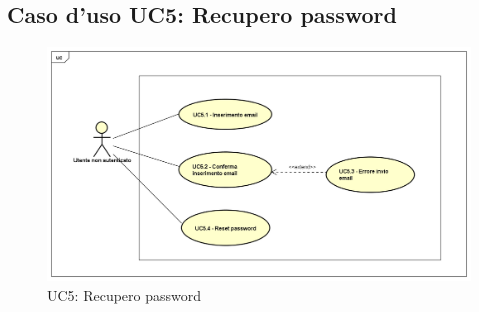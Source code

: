 \newpage
\subsection{Caso d'uso UC5: Recupero password}
\label{UC5}
\begin{figure}[ht]
	\centering
	\includegraphics[scale=0.45]{UML/UC5.png}
	\caption{UC5: Recupero password}
\end{figure}

